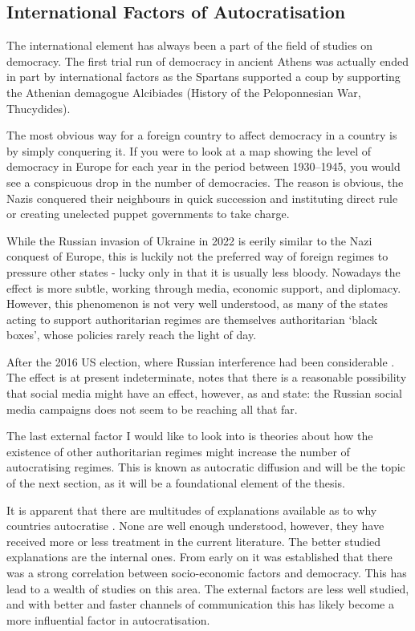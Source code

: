 \subsection{International Factors of Autocratisation}
The international element has always been a part of the field of studies on democracy. The first trial run of democracy in ancient Athens was actually ended in part by international factors as the Spartans supported a coup by supporting the Athenian demagogue Alcibiades (History of the Peloponnesian War, Thucydides). 

The most obvious way for a foreign country to affect democracy in a country is by simply conquering it. If you were to look at a map showing the level of democracy in Europe for each year in the period between 1930--1945, you would see a conspicuous drop in the number of democracies. The reason is obvious, the Nazis conquered their neighbours in quick succession and instituting direct rule or creating unelected puppet governments to take charge.

While the Russian invasion of Ukraine in 2022 is eerily similar to the Nazi conquest of Europe, this is luckily not the preferred way of foreign regimes to pressure other states - lucky only in that it is usually less bloody. Nowadays the effect is more subtle, working through media, economic support, and diplomacy. However, this phenomenon is not very well understood, as many of the states acting to support authoritarian regimes are themselves authoritarian `black boxes', whose policies rarely reach the light of day.  

After the 2016 US election, where Russian interference had been considerable \citep[pp. 14-15]{mueller_report_2019}. The effect is at present indeterminate, \citet{zhuravskaya_political_2020} notes that there is a reasonable possibility that social media might have an effect, however, as \citet{eady_exposure_2023} and \citet{guess_reshares_2023} state: the Russian social media campaigns does not seem to be reaching all that far. 

The last external factor I would like to look into is theories about how the existence of other authoritarian regimes might increase the number of autocratising regimes. This is known as autocratic diffusion and will be the topic of the next section, as it will be a foundational element of the thesis.

It is apparent that there are multitudes of explanations available as to why countries autocratise \citep{berman_causes_2021}. None are well enough understood, however, they have received more or less treatment in the current literature. The better studied explanations are the internal ones. From early on it was established that there was a strong correlation between socio-economic factors and democracy. This has lead to a wealth of studies on this area. The external factors are less well studied, and with better and faster channels of communication this has likely become a more influential factor in autocratisation.

